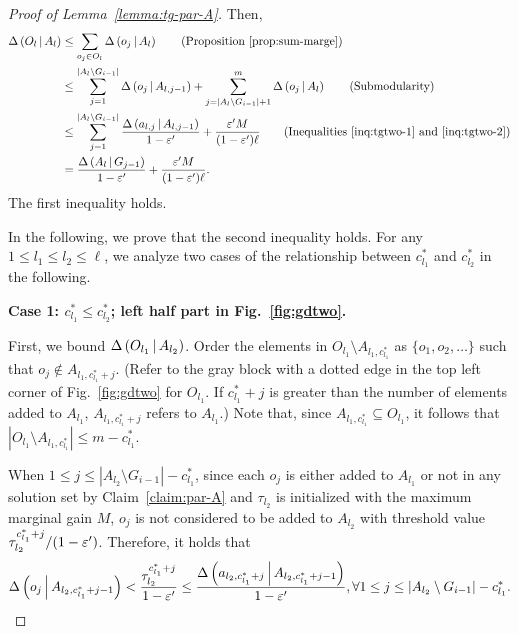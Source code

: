 \begin{proof}[Proof of Lemma~\ref{lemma:tg-par-A}]
Then,
\begin{align*}
\marge{O_{l}}{A_{l}} &\le \sum_{o_j\in O_l} \marge{o_j}{A_{l}} \tag{Proposition~\ref{prop:sum-marge}}\\
&\le \sum_{j=1}^{|A_l\setminus G_{i-1}|} \marge{o_j}{A_{l, j-1}} + 
\sum_{j=|A_l\setminus G_{i-1}|+1}^m \marge{o_j}{A_{l}}\tag{Submodularity}\\
&\le \sum_{j=1}^{|A_l\setminus G_{i-1}|}\frac{\marge{a_{l,j}}{A_{l,j-1}}}{1-\epsi'}+\frac{\epsi' M}{(1-\epsi')\ell}
\tag{Inequalities~\eqref{inq:tgtwo-1} and~\eqref{inq:tgtwo-2}}\\
&= \frac{\marge{A_{l}}{G_{j-1}}}{1-\epsi'}+\frac{\epsi' M}{(1-\epsi')\ell}.
\end{align*}
The first inequality holds.

In the following, we prove that the second inequality holds.
For any $1\le l_1\le l_2\le \ell$,
we analyze two cases of the relationship between $c_{l_1}^* $ and $ c_{l_2}^*$ in the following.


\textbf{Case 1: $c_{l_1}^* \le c_{l_2}^*$; left half part in Fig.~\ref{fig:gdtwo}.}

First, we bound $\Delta \left( O_{l_1} \, \middle| \, A_{l_2} \right)$.
Order the elements in $O_{l_1}\setminus A_{l_1, c_{l_1}^*}$ as $\{o_1, o_2, \ldots\}$ such that $o_j \not \in A_{l_1, c_{l_1}^*+j}$.
(Refer to the gray block with a dotted edge in the top left corner of Fig.~\ref{fig:gdtwo} for $O_{l_1}$.
If $c_{l_1}^*+j$ is greater than the number of elements added to $A_{l_1}$,
$A_{l_1, c_{l_1}^*+j}$ refers to $A_{l_1}$.)
Note that, since $A_{l_1, c_{l_1}^*} \subseteq O_{l_1}$,
it follows that $|O_{l_1}\setminus A_{l_1, c_{l_1}^*}| \le m - c_{l_1}^*$.

When $1 \le j \le |A_{l_2}\setminus G_{i-1}| - c_{l_1}^*$,
since each $o_j$ is either added to $A_{l_1}$ or not in any solution set by Claim~\ref{claim:par-A}
and $\tau_{l_2}$ is initialized with the maximum marginal gain $M$,
$o_j$ is not considered to be added to $A_{l_2}$ with threshold value $\tau_{l_2}^{c_{l_1}^* + j}/(1-\varepsilon')$.
Therefore, it holds that 
\begin{equation}\label{inq:tgtwo-case2-1}
\Delta \left( o_j \, \middle| \, A_{l_2, c_{l_1}^*+j-1} \right) < \frac{\tau_{l_2}^{c_{l_1}^* + j}}{1-\varepsilon'} \le \frac{\Delta \left( a_{l_2, c_{l_1}^* + j} \, \middle| \, A_{l_2, c_{l_1}^* + j-1} \right)}{1-\varepsilon'}, \forall 1\le j\le |A_{l_2}\setminus G_{i-1}|-c_{l_1}^*.
\end{equation}


\end{proof}
